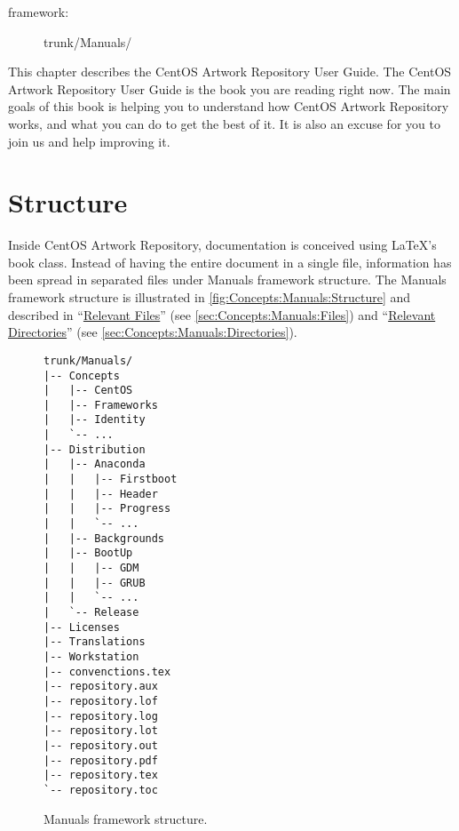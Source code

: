 
\begin{description}
\item[framework:] trunk/Manuals/
\end{description}

\noindent This chapter describes the CentOS Artwork Repository User
Guide.  The CentOS Artwork Repository User Guide is the book you are
reading right now. The main goals of this book is helping you to
understand how CentOS Artwork Repository works, and what you can do to
get the best of it.  It is also an excuse for you to join us and help
improving it.

\section{Structure}

Inside CentOS Artwork Repository, documentation is conceived using
\LaTeX's book class. Instead of having the entire document in a single
file, information has been spread in separated files under Manuals
framework structure. The Manuals framework structure is illustrated in
\autoref{fig:Concepts:Manuals:Structure} and described in
``\hyperlink{sec:Concepts:Manuals:Files}{Relevant Files}'' (see
\autoref{sec:Concepts:Manuals:Files}) and
``\hyperlink{sec:Concepts:Manuals:Directories}{Relevant Directories}''
(see \autoref{sec:Concepts:Manuals:Directories}).

\begin{figure}[!hbp]
\hrulefill
\begin{verbatim}
trunk/Manuals/
|-- Concepts
|   |-- CentOS
|   |-- Frameworks
|   |-- Identity
|   `-- ...
|-- Distribution
|   |-- Anaconda
|   |   |-- Firstboot
|   |   |-- Header
|   |   |-- Progress
|   |   `-- ...
|   |-- Backgrounds
|   |-- BootUp
|   |   |-- GDM
|   |   |-- GRUB
|   |   `-- ...
|   `-- Release
|-- Licenses
|-- Translations
|-- Workstation
|-- convenctions.tex
|-- repository.aux
|-- repository.lof
|-- repository.log
|-- repository.lot
|-- repository.out
|-- repository.pdf
|-- repository.tex
`-- repository.toc
\end{verbatim}
\hrulefill
\caption{Manuals framework structure.%
   \label{fig:Concepts:Manuals:Structure}}
\end{figure}

